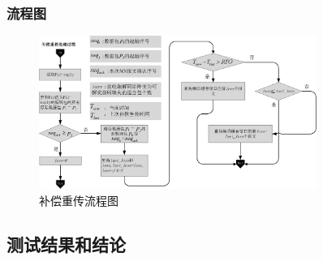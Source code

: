 \begin{frame}
	\frametitle{流程图}
	\begin{figure}
		\hspace{-1.5em}
		\includegraphics[height=5cm]{../figures/bccc.eps}
		\caption{补偿重传流程图}
		\label{fig:buchang}
	\end{figure}
\end{frame}

\subsection{测试结果和结论}

